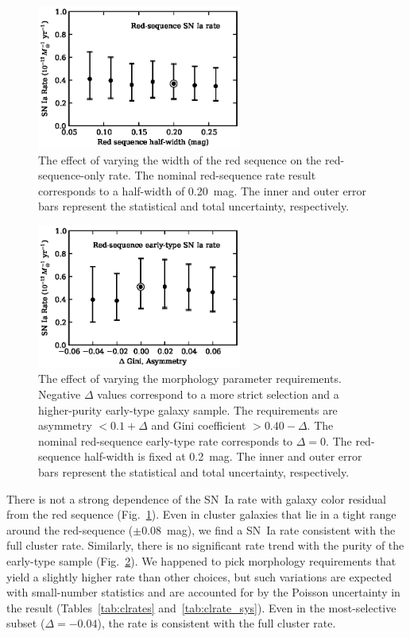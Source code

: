 \begin{figure}
\includegraphics[width=0.6\textwidth]{figures/clrate/ratevscut1.eps}
\caption[Red-sequence-only rate versus width of red sequence]
{The effect of varying the width of the red sequence on the
  red-sequence-only rate. The nominal red-sequence rate result
  corresponds to a half-width of 0.20~mag. The inner and outer error
  bars represent the statistical and total uncertainty, respectively.
\label{fig:ratevscut1}}
\end{figure}

\begin{figure}
\includegraphics[width=0.6\textwidth]{figures/clrate/ratevscut2.eps}
\caption[Elliptical-only rate versus morphology requirements]
{The effect of varying the morphology parameter requirements. Negative
  $\Delta$ values correspond to a more strict selection and a
  higher-purity early-type galaxy sample. The requirements are
  asymmetry $<0.1+\Delta$ and Gini coefficient $> 0.40-\Delta$. The
  nominal red-sequence early-type rate corresponds to $\Delta = 0$.
  The red-sequence half-width is fixed at 0.2~mag. The inner and outer
  error bars represent the statistical and total uncertainty,
  respectively.
\label{fig:ratevscut2}}
\end{figure}


There is not a strong dependence of the SN~Ia rate with galaxy color
residual from the red sequence (Fig.~\ref{fig:ratevscut1}). Even in
cluster galaxies that lie in a tight range around the red-sequence
($\pm 0.08$~mag), we find a SN~Ia rate consistent with the full
cluster rate. Similarly, there is no significant rate trend with the
purity of the early-type sample (Fig.~\ref{fig:ratevscut2}). We
happened to pick morphology requirements that yield a slightly higher
rate than other choices, but such variations are expected with
small-number statistics and are accounted for by the Poisson
uncertainty in the result (Tables~\ref{tab:clrates}
and~\ref{tab:clrate_sys}). Even in the most-selective subset ($\Delta
= -0.04$), the rate is consistent with the full cluster rate.
